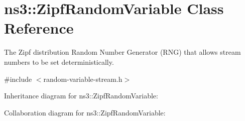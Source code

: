 \hypertarget{classns3_1_1ZipfRandomVariable}{}\section{ns3\+:\+:Zipf\+Random\+Variable Class Reference}
\label{classns3_1_1ZipfRandomVariable}


The Zipf distribution Random Number Generator (R\+NG) that allows stream numbers to be set deterministically.  




{\ttfamily \#include $<$random-\/variable-\/stream.\+h$>$}



Inheritance diagram for ns3\+:\+:Zipf\+Random\+Variable\+:


Collaboration diagram for ns3\+:\+:Zipf\+Random\+Variable\+:
